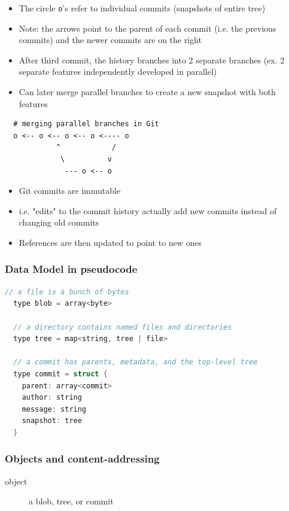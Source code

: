 \documentclass[letterpaper,12pt]{article}
\begin{document}
\begin{itemize}
 \item The circle \lstinline{o}'s refer to individual commits (snapshots of entire tree)
 \item Note: the arrows point to the parent of each commit (i.e. the previous commits) and the newer commits are on the right
 \item After third commit, the history branches into 2 separate branches (ex. 2 separate features independently developed in parallel)
 \item Can later merge parallel branches to create a new snapshot with both features
\end{itemize}

\begin{lstlisting}
  # merging parallel branches in Git
  o <-- o <-- o <-- o <---- o
            ^            /
             \          v
              --- o <-- o
\end{lstlisting}

\begin{itemize}
 \item Git commits are immutable
 \item i.e. "edits" to the commit history actually add new commits instead of changing old commits
 \item References are then updated to point to new ones
\end{itemize}


\subsubsection{Data Model in pseudocode}

\begin{lstlisting}[language=c++]
  // a file is a bunch of bytes
  type blob = array<byte>

  // a directory contains named files and directories
  type tree = map<string, tree | file>

  // a commit has parents, metadata, and the top-level tree
  type commit = struct {
    parent: array<commit>
    author: string
    message: string
    snapshot: tree
  }
\end{lstlisting}


\subsubsection{Objects and content-addressing}
\begin{description}
 \item[object] a blob, tree, or commit
\end{description}
\end{document}
